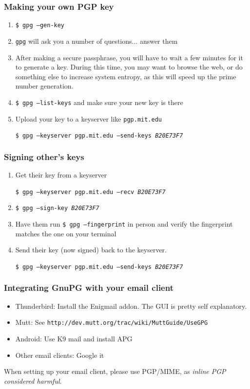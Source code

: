 \documentclass{beamer}
\begin{document}
\begin{frame}
    \frametitle{Making your own PGP key}
    \begin{enumerate}[<+->]
        \item \texttt{\$ gpg --gen-key}
        \item \texttt{gpg} will ask you a number of questions... answer them
        \item After making a secure passphrase, you will have to wait a few
            minutes for it to generate a key. During this time, you may want to
            browse the web, or do something else to increase system entropy, as
            this will speed up the prime number generation.
        \item \texttt{\$ gpg --list-keys} and make sure your new key is there
        \item Upload your key to a keyserver like \texttt{pgp.mit.edu}\par
            \texttt{\small \$ gpg --keyserver pgp.mit.edu --send-keys \emph{B20E73F7}}
    \end{enumerate}
\end{frame}

\begin{frame}
    \frametitle{Signing other's keys}
    \begin{enumerate}[<+->]
        \item Get their key from a keyserver\par
            \texttt{\small \$ gpg --keyserver pgp.mit.edu --recv \emph{B20E73F7}}
        \item \texttt{\$ gpg --sign-key \emph{B20E73F7}}
        \item Have them run \texttt{\$ gpg --fingerprint} in person and verify
            the fingerprint matches the one on your terminal
        \item Send their key (now signed) back to the keyserver.\par
            \texttt{\small \$ gpg --keyserver pgp.mit.edu --send-keys \emph{B20E73F7}}
    \end{enumerate}
\end{frame}

\begin{frame}
    \frametitle{Integrating GnuPG with your email client}
    \begin{itemize}
        \item Thunderbird: Install the Enigmail addon. The GUI is pretty self
            explanatory.
        \item Mutt: See \texttt{http://dev.mutt.org/trac/wiki/MuttGuide/UseGPG}
        \item Android: Use K9 mail and install APG
        \item Other email clients: Google it
    \end{itemize}
    When setting up your email client, please use PGP/MIME, as
    \emph{inline PGP considered harmful}.
\end{frame}
\end{document}
